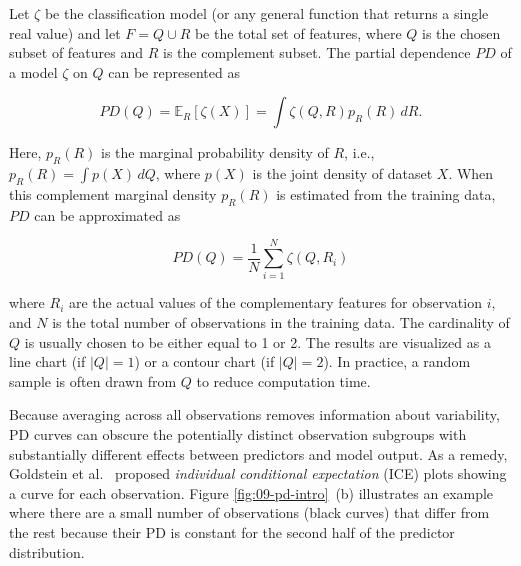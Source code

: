 \documentclass[
  oneside]{book}
\begin{document}
Let \(\zeta\) be the classification model (or any general function that returns a single real value) and let \(F=Q\cup R\) be the total set of features, where \(Q\) is the chosen subset of features and \(R\) is the complement subset.
The partial dependence \(PD\) of a model \(\zeta\) on \(Q\) can be represented as

\begin{equation}
PD(Q)=\mathbb{E}_{R}\left[\zeta(X)\right]=\int\zeta(Q,R)p_R(R)\,dR.
\label{eq:pd}
\end{equation}

Here, \(p_R(R)\) is the marginal probability density of \(R\), i.e., \(p_R(R)=\int p(X)\,dQ\), where \(p(X)\) is the joint density of dataset \(X\).
When this complement marginal density \(p_R(R)\) is estimated from the training data, \(PD\) can be approximated as

\begin{equation}
PD(Q)=\frac{1}{N}\sum_{i=1}^N \zeta(Q,R_{i})
\label{eq:pd-approx}
\end{equation}

where \(R_i\) are the actual values of the complementary features for observation \(i\), and \(N\) is the total number of observations in the training data.
The cardinality of \(Q\) is usually chosen to be either equal to 1 or 2.
The results are visualized as a line chart (if \(|Q|=1\)) or a contour chart (if \(|Q|=2\)).
In practice, a random sample is often drawn from \(Q\) to reduce computation time.

Because averaging across all observations removes information about variability, PD curves can obscure the potentially distinct observation subgroups with substantially different effects between predictors and model output.
As a remedy, Goldstein et al.~\autocite{Goldstein:ICE2015} proposed \emph{individual conditional expectation} (ICE) plots showing a curve for each observation.
Figure \ref{fig:09-pd-intro}~(b) illustrates an example where there are a small number of observations (black curves) that differ from the rest because their PD is constant for the second half of the predictor distribution.
\end{document}
